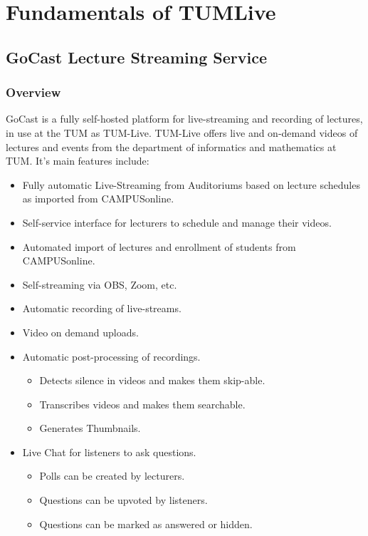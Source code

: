 
\chapter{Fundamentals of TUMLive}\label{chapter:fundamentals}

\section{GoCast Lecture Streaming Service}

\subsection{Overview}

GoCast is a fully self-hosted platform for live-streaming and recording of lectures, in use at the \ac{TUM} as TUM-Live.
TUM-Live offers live and on-demand videos of lectures and events from the department of informatics and mathematics at \ac{TUM}. 
It's main features include:

\begin{itemize}
    \item Fully automatic Live-Streaming from Auditoriums based on lecture schedules as imported from CAMPUSonline.
    \item Self-service interface for lecturers to schedule and manage their videos.
    \item Automated import of lectures and enrollment of students from CAMPUSonline.
    \item Self-streaming via OBS, Zoom, etc.
    \item Automatic recording of live-streams.
    \item Video on demand uploads.
    \item Automatic post-processing of recordings.
    \begin{itemize}
        \item Detects silence in videos and makes them skip-able.
        \item Transcribes videos and makes them searchable.
        \item Generates Thumbnails.
    \end{itemize}
    \item Live Chat for listeners to ask questions.
    \begin{itemize}
        \item Polls can be created by lecturers.
        \item Questions can be upvoted by listeners.
        \item Questions can be marked as answered or hidden.
    \end{itemize}
\end{itemize}

